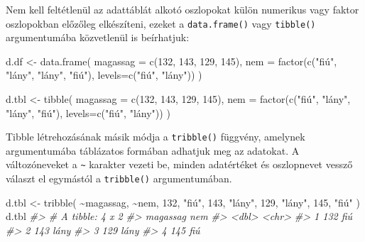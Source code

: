 \documentclass[
]{book}
\newenvironment{Shaded}{\begin{snugshade}}{\end{snugshade}}
\newcommand{\AttributeTok}[1]{\textcolor[rgb]{0.77,0.63,0.00}{#1}}
\newcommand{\CommentTok}[1]{\textcolor[rgb]{0.56,0.35,0.01}{\textit{#1}}}
\newcommand{\DecValTok}[1]{\textcolor[rgb]{0.00,0.00,0.81}{#1}}
\newcommand{\FunctionTok}[1]{\textcolor[rgb]{0.00,0.00,0.00}{#1}}
\newcommand{\NormalTok}[1]{#1}
\newcommand{\OtherTok}[1]{\textcolor[rgb]{0.56,0.35,0.01}{#1}}
\newcommand{\SpecialCharTok}[1]{\textcolor[rgb]{0.00,0.00,0.00}{#1}}
\newcommand{\StringTok}[1]{\textcolor[rgb]{0.31,0.60,0.02}{#1}}
\begin{document}
Nem kell feltétlenül az adattáblát alkotó oszlopokat külön numerikus vagy faktor oszlopokban előzőleg elkészíteni, ezeket a \texttt{data.frame()} vagy \texttt{tibble()} argumentumába közvetlenül is beírhatjuk:

\begin{Shaded}
\begin{Highlighting}[]
\NormalTok{d.df }\OtherTok{\textless{}{-}} \FunctionTok{data.frame}\NormalTok{(}
  \AttributeTok{magassag =} \FunctionTok{c}\NormalTok{(}\DecValTok{132}\NormalTok{, }\DecValTok{143}\NormalTok{, }\DecValTok{129}\NormalTok{, }\DecValTok{145}\NormalTok{),}
  \AttributeTok{nem =} \FunctionTok{factor}\NormalTok{(}\FunctionTok{c}\NormalTok{(}\StringTok{"fiú"}\NormalTok{, }\StringTok{"lány"}\NormalTok{, }\StringTok{"lány"}\NormalTok{, }\StringTok{"fiú"}\NormalTok{), }\AttributeTok{levels=}\FunctionTok{c}\NormalTok{(}\StringTok{"fiú"}\NormalTok{, }\StringTok{"lány"}\NormalTok{)) }
\NormalTok{)}

\NormalTok{d.tbl }\OtherTok{\textless{}{-}} \FunctionTok{tibble}\NormalTok{(}
  \AttributeTok{magassag =} \FunctionTok{c}\NormalTok{(}\DecValTok{132}\NormalTok{, }\DecValTok{143}\NormalTok{, }\DecValTok{129}\NormalTok{, }\DecValTok{145}\NormalTok{),}
  \AttributeTok{nem =} \FunctionTok{factor}\NormalTok{(}\FunctionTok{c}\NormalTok{(}\StringTok{"fiú"}\NormalTok{, }\StringTok{"lány"}\NormalTok{, }\StringTok{"lány"}\NormalTok{, }\StringTok{"fiú"}\NormalTok{), }\AttributeTok{levels=}\FunctionTok{c}\NormalTok{(}\StringTok{"fiú"}\NormalTok{, }\StringTok{"lány"}\NormalTok{)) }
\NormalTok{)}
\end{Highlighting}
\end{Shaded}

Tibble létrehozásának másik módja a \texttt{tribble()} függvény, amelynek argumentumába táblázatos formában adhatjuk meg az adatokat. A változóneveket a \texttt{\textasciitilde{}} karakter vezeti be, minden adatértéket és oszlopnevet vessző választ el egymástól a \texttt{tribble()} argumentumában.

\begin{Shaded}
\begin{Highlighting}[]
\NormalTok{d.tbl }\OtherTok{\textless{}{-}} \FunctionTok{tribble}\NormalTok{(}
  \SpecialCharTok{\textasciitilde{}}\NormalTok{magassag,  }\SpecialCharTok{\textasciitilde{}}\NormalTok{nem,}
  \DecValTok{132}\NormalTok{, }\StringTok{"fiú"}\NormalTok{,}
  \DecValTok{143}\NormalTok{, }\StringTok{"lány"}\NormalTok{,}
  \DecValTok{129}\NormalTok{, }\StringTok{"lány"}\NormalTok{,}
  \DecValTok{145}\NormalTok{, }\StringTok{"fiú"}
\NormalTok{)}
\NormalTok{d.tbl}
\CommentTok{\#\textgreater{} \# A tibble: 4 x 2}
\CommentTok{\#\textgreater{}   magassag nem  }
\CommentTok{\#\textgreater{}      \textless{}dbl\textgreater{} \textless{}chr\textgreater{}}
\CommentTok{\#\textgreater{} 1      132 fiú  }
\CommentTok{\#\textgreater{} 2      143 lány }
\CommentTok{\#\textgreater{} 3      129 lány }
\CommentTok{\#\textgreater{} 4      145 fiú}
\end{Highlighting}
\end{Shaded}
\end{document}
